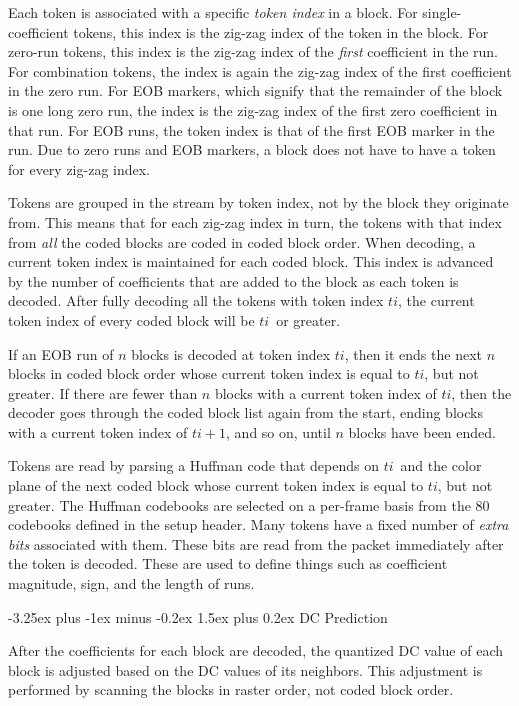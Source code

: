 \documentclass[9pt,letterpaper]{book}
\makeatletter
\newcommand{\idx}[1]{{\ensuremath{\mathit{#1}}}}
\newcommand{\ti}{\idx{ti}}
\newcommand{\term}[1]{{\em #1}}
\numberwithin{equation}{chapter}
\numberwithin{figure}{chapter}
\numberwithin{table}{chapter}
\renewcommand{\paragraph}{\@startsection{paragraph}{4}{0ex}%
 {-3.25ex plus -1ex minus -0.2ex}%
 {1.5ex plus 0.2ex}%
 {\normalfont\normalsize\bfseries}}
\makeatother
\begin{document}
Each token is associated with a specific \term{token index} in a block.
For single-coefficient tokens, this index is the zig-zag index of the token in
 the block.
For zero-run tokens, this index is the zig-zag index of the {\em first}
 coefficient in the run.
For combination tokens, the index is again the zig-zag index of the first
 coefficient in the zero run.
For EOB markers, which signify that the remainder of the block is one long zero
 run, the index is the zig-zag index of the first zero coefficient in that run.
For EOB runs, the token index is that of the first EOB marker in the run.
Due to zero runs and EOB markers, a block does not have to have a token for
 every zig-zag index.

Tokens are grouped in the stream by token index, not by the block they
 originate from.
This means that for each zig-zag index in turn, the tokens with that index from
 {\em all} the coded blocks are coded in coded block order.
When decoding, a current token index is maintained for each coded block.
This index is advanced by the number of coefficients that are added to the
 block as each token is decoded.
After fully decoding all the tokens with token index \ti, the current token
 index of every coded block will be \ti\ or greater.

If an EOB run of $n$ blocks is decoded at token index \ti, then it ends the
 next $n$ blocks in coded block order whose current token index is equal to
 \ti, but not greater.
If there are fewer than $n$ blocks with a current token index of \ti, then the
 decoder goes through the coded block list again from the start, ending blocks
 with a current token index of $\ti+1$, and so on, until $n$ blocks have been
 ended.

Tokens are read by parsing a Huffman code that depends on \ti\ and the color
 plane of the next coded block whose current token index is equal to \ti, but
 not greater.
The Huffman codebooks are selected on a per-frame basis from the 80 codebooks
 defined in the setup header.
Many tokens have a fixed number of \term{extra bits} associated with them.
These bits are read from the packet immediately after the token is decoded.
These are used to define things such as coefficient magnitude, sign, and the
 length of runs.

\paragraph{DC Prediction}

After the coefficients for each block are decoded, the quantized DC value of
 each block is adjusted based on the DC values of its neighbors.
This adjustment is performed by scanning the blocks in raster order, not coded
 block order.
\end{document}
